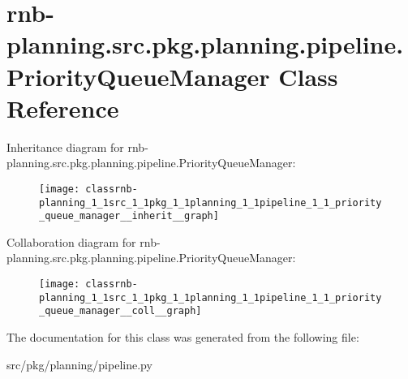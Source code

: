 \hypertarget{classrnb-planning_1_1src_1_1pkg_1_1planning_1_1pipeline_1_1_priority_queue_manager}{}\section{rnb-\/planning.src.\+pkg.\+planning.\+pipeline.\+Priority\+Queue\+Manager Class Reference}
\label{classrnb-planning_1_1src_1_1pkg_1_1planning_1_1pipeline_1_1_priority_queue_manager}


Inheritance diagram for rnb-\/planning.src.\+pkg.\+planning.\+pipeline.\+Priority\+Queue\+Manager\+:\nopagebreak
\begin{figure}[H]
\begin{center}
\leavevmode
\texttt{[image: classrnb-planning\_1\_1src\_1\_1pkg\_1\_1planning\_1\_1pipeline\_1\_1\_priority\_queue\_manager\_\_inherit\_\_graph]}
\end{center}
\end{figure}


Collaboration diagram for rnb-\/planning.src.\+pkg.\+planning.\+pipeline.\+Priority\+Queue\+Manager\+:\nopagebreak
\begin{figure}[H]
\begin{center}
\leavevmode
\texttt{[image: classrnb-planning\_1\_1src\_1\_1pkg\_1\_1planning\_1\_1pipeline\_1\_1\_priority\_queue\_manager\_\_coll\_\_graph]}
\end{center}
\end{figure}


The documentation for this class was generated from the following file\+:\begin{DoxyCompactItemize}
\item 
src/pkg/planning/pipeline.\+py\end{DoxyCompactItemize}
